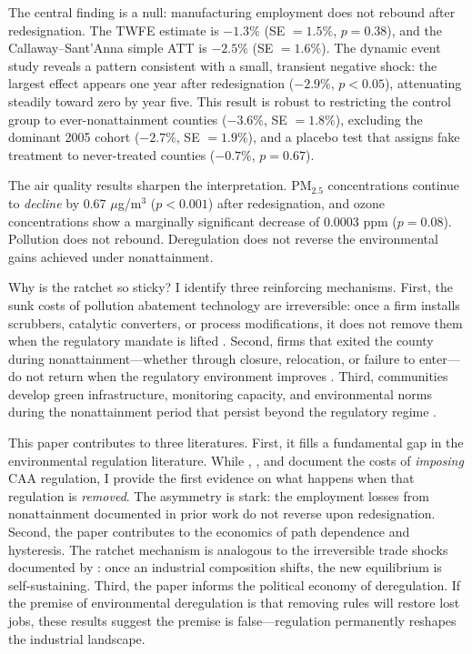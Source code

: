 \documentclass[12pt]{article}
\begin{document}
The central finding is a null: manufacturing employment does not rebound after redesignation. The TWFE estimate is $-1.3\%$ (SE $= 1.5\%$, $p = 0.38$), and the Callaway--Sant'Anna simple ATT is $-2.5\%$ (SE $= 1.6\%$). The dynamic event study reveals a pattern consistent with a small, transient negative shock: the largest effect appears one year after redesignation ($-2.9\%$, $p < 0.05$), attenuating steadily toward zero by year five. This result is robust to restricting the control group to ever-nonattainment counties ($-3.6\%$, SE $= 1.8\%$), excluding the dominant 2005 cohort ($-2.7\%$, SE $= 1.9\%$), and a placebo test that assigns fake treatment to never-treated counties ($-0.7\%$, $p = 0.67$).

The air quality results sharpen the interpretation. PM$_{2.5}$ concentrations continue to \textit{decline} by 0.67 $\mu$g/m$^3$ ($p < 0.001$) after redesignation, and ozone concentrations show a marginally significant decrease of 0.0003 ppm ($p = 0.08$). Pollution does not rebound. Deregulation does not reverse the environmental gains achieved under nonattainment.

Why is the ratchet so sticky? I identify three reinforcing mechanisms. First, the sunk costs of pollution abatement technology are irreversible: once a firm installs scrubbers, catalytic converters, or process modifications, it does not remove them when the regulatory mandate is lifted \citep{Ryan2012}. Second, firms that exited the county during nonattainment---whether through closure, relocation, or failure to enter---do not return when the regulatory environment improves \citep{Levinson1996, Bartik1991}. Third, communities develop green infrastructure, monitoring capacity, and environmental norms during the nonattainment period that persist beyond the regulatory regime \citep{Deschenes2017}.

This paper contributes to three literatures. First, it fills a fundamental gap in the environmental regulation literature. While \citet{Greenstone2002}, \citet{Walker2013}, and \citet{Curtis2018} document the costs of \textit{imposing} CAA regulation, I provide the first evidence on what happens when that regulation is \textit{removed}. The asymmetry is stark: the employment losses from nonattainment documented in prior work do not reverse upon redesignation. Second, the paper contributes to the economics of path dependence and hysteresis. The ratchet mechanism is analogous to the irreversible trade shocks documented by \citet{AutorDornHanson2013}: once an industrial composition shifts, the new equilibrium is self-sustaining. Third, the paper informs the political economy of deregulation. If the premise of environmental deregulation is that removing rules will restore lost jobs, these results suggest the premise is false---regulation permanently reshapes the industrial landscape.
\end{document}
